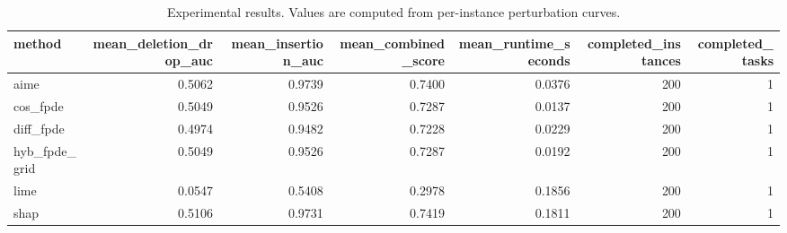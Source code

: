 \begin{table}[t]
\caption{Experimental results. Values are computed from per-instance perturbation curves.}
\label{tab:main_results_computed}
\centering
\begin{tabular}{lrrrrrr}
\toprule
method & mean\_deletion\_drop\_auc & mean\_insertion\_auc & mean\_combined\_score & mean\_runtime\_seconds & completed\_instances & completed\_tasks \\
\midrule
aime & 0.5062 & 0.9739 & 0.7400 & 0.0376 & 200 & 1 \\
cos\_fpde & 0.5049 & 0.9526 & 0.7287 & 0.0137 & 200 & 1 \\
diff\_fpde & 0.4974 & 0.9482 & 0.7228 & 0.0229 & 200 & 1 \\
hyb\_fpde\_grid & 0.5049 & 0.9526 & 0.7287 & 0.0192 & 200 & 1 \\
lime & 0.0547 & 0.5408 & 0.2978 & 0.1856 & 200 & 1 \\
shap & 0.5106 & 0.9731 & 0.7419 & 0.1811 & 200 & 1 \\
\bottomrule
\end{tabular}

\end{table}
